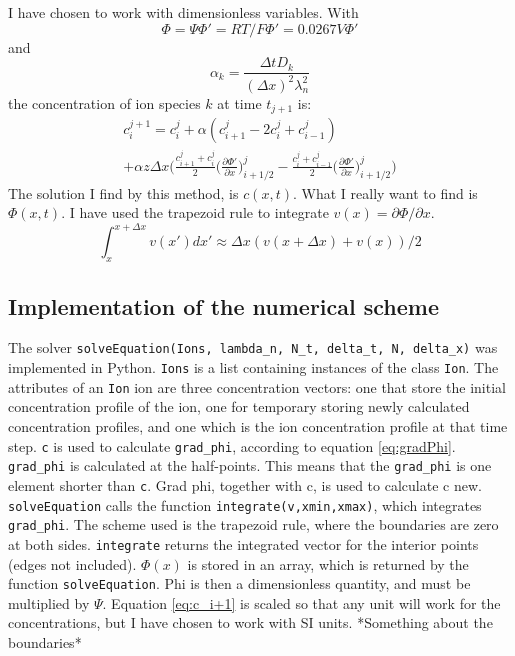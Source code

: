 \documentclass{article}
\begin{document}
I have chosen to work with dimensionless variables. With $$\Phi = \Psi\Phi' = RT/F\Phi' = 0.0267V \Phi'$$ and $$\alpha_k = \frac{\Delta t D_k}{(\Delta x)^2 \lambda_n^2}$$ the concentration of ion species $k$ at time $t_{j+1}$ is:
\begin{multline}\label{eq:c_i+1}
 c_i^{j+1}= c_i^j + \alpha(c_{i+1}^j-2c_i^j+c_{i-1}^j)\\ + \alpha z\Delta x \bigg(\frac{c_{i+1}^j+c_i^j}{2} \big(\frac{\partial \Phi'}{\partial x}\big)_{i+1/2}^j-\frac{c_{i}^j+c_{i-1}^j}{2} \big(\frac{\partial \Phi'}{\partial x}\big)_{i+1/2}^j\bigg)
\end{multline}
The solution I find by this method, is $c(x,t)$. What I really want to find is $\Phi(x,t)$. I have used the trapezoid rule to integrate $v(x) =\partial \Phi / \partial x$.
\begin{equation}
\int_x^{x+\Delta x}v(x') dx'  \approx \Delta x ( v(x+\Delta x) + v(x) )/2
\end{equation}

\subsection{Implementation of the numerical scheme}
The solver \texttt{solveEquation(Ions, lambda\_n, N\_t, delta\_t, N, delta\_x)} was implemented in Python.  \texttt{Ions} is a list containing instances of the class \texttt{Ion}. The attributes of an \texttt{Ion} ion are three concentration vectors: one that store the initial concentration profile of the ion, one for temporary storing newly calculated concentration profiles, and one which is the ion concentration profile at that time step. \texttt{c} is used to calculate \texttt{grad\_phi}, according to equation \ref{eq:gradPhi}. \texttt{grad\_phi} is calculated at the half-points. This means that the \texttt{grad\_phi} is one element shorter than \texttt{c}.   Grad phi, together with c, is used to calculate c new. \texttt{solveEquation} calls the function \texttt{integrate(v,xmin,xmax)}, which integrates \texttt{grad\_phi}. The scheme used is the trapezoid rule, where the boundaries are zero at both sides. \texttt{integrate} returns the integrated vector for the interior points (edges not included). $\Phi(x)$ is stored in an array, which is returned by the function \texttt{solveEquation}. Phi is then a dimensionless quantity, and must be multiplied by $\Psi$. Equation \ref{eq:c_i+1} is scaled so that any unit will work for the concentrations, but I have chosen to work with SI units.  *Something about the boundaries*
\end{document}
